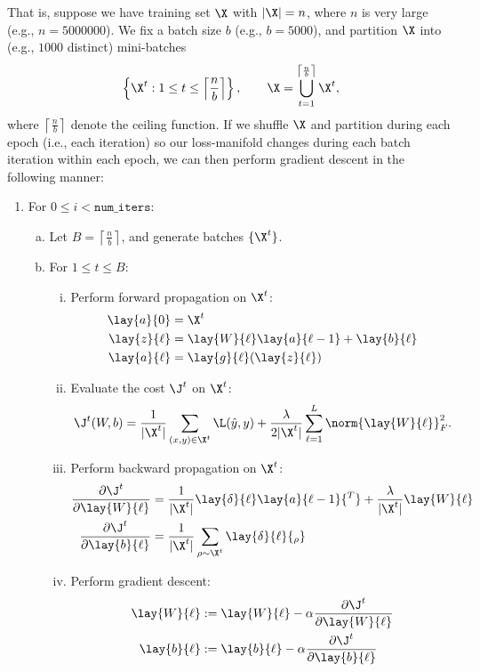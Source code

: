 That is, suppose we have training set $\X$ with $|\X|=n$, where $n$ is very large (e.g., $n=5000000$).  We fix a batch size $b$ (e.g., $b=5000$), and partition $\X$ into (e.g., $1000$ distinct) mini-batches
$$\left\{\X^t:1\leq t\leq \left\lceil\frac{n}{b}\right\rceil\right\},\qquad\X=\bigcup_{t=1}^{\left\lceil\frac{n}{b}\right\rceil}\X^t,$$
where $\left\lceil\frac{n}{b}\right\rceil$ denote the ceiling function.  If we shuffle $\X$ and partition during each epoch (i.e., each iteration) so our loss-manifold changes during each batch iteration within each epoch, we can then perform gradient descent in the following manner:
\begin{enumerate}[1.]
	\item For $0\leq i<\texttt{num\_iters}$:
		\begin{enumerate}[a.]
			\item Let $B=\left\lceil\frac{n}{b}\right\rceil$, and generate batches $\{\X^t\}$.
			\item For $1\leq t\leq B$:
			\begin{enumerate}[i.]
				\item Perform forward propagation on $\X^t$:
				\begin{align*}
					\lay{a}{0}&=\X^t\\
					\lay{z}{\ell}&=\lay{W}{\ell}\lay{a}{\ell-1}+\lay{b}{\ell}\\
					\lay{a}{\ell}&=\lay{g}{\ell}(\lay{z}{\ell})
				\end{align*}
				\item Evaluate the cost $\J^t$ on $\X^t$:
				$$\J^t(W,b)=\frac{1}{|\X^t|}\sum_{(x,y)\in\X^t}\L(\hat{y},y)+\frac{\lambda}{2|\X^t|}\sum_{\ell=1}^L\norm{\lay{W}{\ell}}_F^2.$$
				\item Perform backward propagation on $\X^t$:
				\begin{align*}
					\frac{\partial\J^t}{\partial\lay{W}{\ell}}&=\frac{1}{|\X^t|}\lay{\delta}{\ell}\lay{a}{\ell - 1}{^T}+\frac{\lambda}{|\X^t|}\lay{W}{\ell}\\
					\frac{\partial\J^t}{\partial\lay{b}{\ell}}&=\frac{1}{|\X^t|}\sum_{\rho\sim\X^t}\lay{\delta}{\ell}{_\rho}
				\end{align*}
				\item Perform gradient descent:
				\begin{align*}
					\lay{W}{\ell}&:=\lay{W}{\ell}-\alpha \frac{\partial\J^t}{\partial\lay{W}{\ell}}\\
					\lay{b}{\ell}&:=\lay{b}{\ell}-\alpha \frac{\partial\J^t}{\partial\lay{b}{\ell}}
				\end{align*}
			\end{enumerate}
		\end{enumerate}
\end{enumerate}

